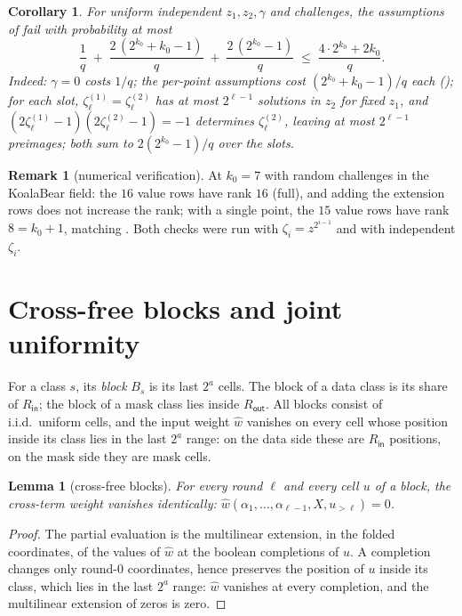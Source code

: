 \documentclass{article}
\newtheorem{lemma}{Lemma}
\newtheorem{corollary}{Corollary}
\theoremstyle{definition}
\newtheorem{remark}{Remark}
\begin{document}
\begin{corollary}\label{cor:twopointprob}
For uniform independent $z_1, z_2, \gamma$ and challenges, the assumptions of  fail with probability at most
\[
\frac{1}{q} \;+\; \frac{2\,(2^{k_0} + k_0 - 1)}{q} \;+\; \frac{2\,(2^{k_0} - 1)}{q} \;\leq\; \frac{4 \cdot 2^{k_0} + 2 k_0}{q} .
\]
Indeed: $\gamma = 0$ costs $1/q$; the per-point assumptions cost $(2^{k_0} + k_0 - 1)/q$ each (); for each slot, $\zeta^{(1)}_\ell = \zeta^{(2)}_\ell$ has at most $2^{\ell-1}$ solutions in $z_2$ for fixed $z_1$, and $(2\zeta^{(1)}_\ell - 1)(2\zeta^{(2)}_\ell - 1) = -1$ determines $\zeta^{(2)}_\ell$, leaving at most $2^{\ell - 1}$ preimages; both sum to $2(2^{k_0} - 1)/q$ over the slots.
\end{corollary}

\begin{remark}[numerical verification]
At $k_0 = 7$ with random challenges in the KoalaBear field: the $16$ value rows have rank $16$ (full), and adding the extension rows does not increase the rank; with a single point, the $15$ value rows have rank $8 = k_0 + 1$, matching . Both checks were run with $\zeta_i = z^{2^{i-1}}$ and with independent $\zeta_i$.
\end{remark}

\section{Cross-free blocks and joint uniformity}\label{sec:uniform}

For a class $s$, its \emph{block} $B_s$ is its last $2^a$ cells. The block of a data class is its share of $R_{\mathsf{in}}$; the block of a mask class lies inside $R_{\mathsf{out}}$. All blocks consist of i.i.d.\ uniform cells, and the input weight $\hat{w}$ vanishes on every cell whose position inside its class lies in the last $2^a$ range: on the data side these are $R_{\mathsf{in}}$ positions, on the mask side they are mask cells.

\begin{lemma}[cross-free blocks]\label{lem:blocks}
For every round $\ell$ and every cell $u$ of a block, the cross-term weight vanishes identically: $\hat{w}(\alpha_1, \dots, \alpha_{\ell-1}, X, u_{>\ell}) = 0$.
\end{lemma}

\begin{proof}
The partial evaluation is the multilinear extension, in the folded coordinates, of the values of $\hat{w}$ at the boolean completions of $u$. A completion changes only round-0 coordinates, hence preserves the position of $u$ inside its class, which lies in the last $2^a$ range: $\hat{w}$ vanishes at every completion, and the multilinear extension of zeros is zero.
\end{proof}
\end{document}
